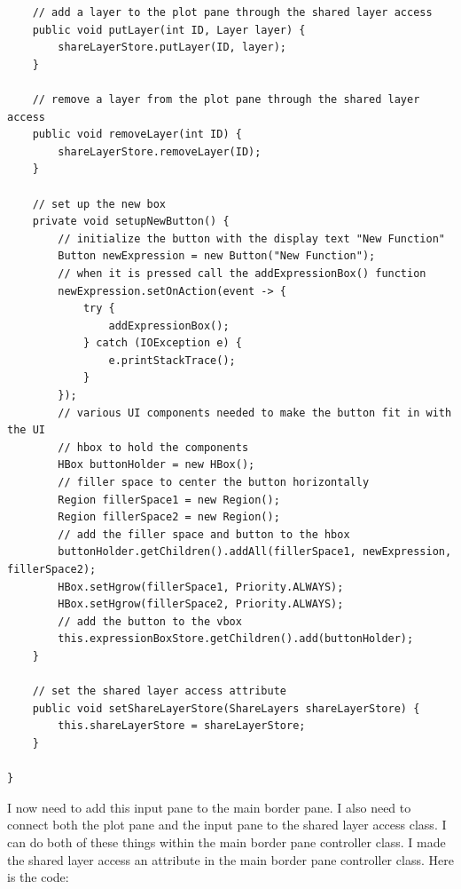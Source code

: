 \documentclass[../../../../main.tex]{subfiles}
\begin{document}
\begin{verbatim}
	// add a layer to the plot pane through the shared layer access
	public void putLayer(int ID, Layer layer) {
		shareLayerStore.putLayer(ID, layer);
	}

	// remove a layer from the plot pane through the shared layer access
	public void removeLayer(int ID) {
		shareLayerStore.removeLayer(ID);
	}

	// set up the new box
	private void setupNewButton() {
		// initialize the button with the display text "New Function"
		Button newExpression = new Button("New Function");
		// when it is pressed call the addExpressionBox() function
		newExpression.setOnAction(event -> {
			try {
				addExpressionBox();
			} catch (IOException e) {
				e.printStackTrace();
			}
		});
		// various UI components needed to make the button fit in with the UI
		// hbox to hold the components
		HBox buttonHolder = new HBox();
		// filler space to center the button horizontally
		Region fillerSpace1 = new Region();
		Region fillerSpace2 = new Region();
		// add the filler space and button to the hbox
		buttonHolder.getChildren().addAll(fillerSpace1, newExpression, fillerSpace2);
		HBox.setHgrow(fillerSpace1, Priority.ALWAYS);
		HBox.setHgrow(fillerSpace2, Priority.ALWAYS);
		// add the button to the vbox
		this.expressionBoxStore.getChildren().add(buttonHolder);
	}

	// set the shared layer access attribute
	public void setShareLayerStore(ShareLayers shareLayerStore) {
		this.shareLayerStore = shareLayerStore;
	}

}
\end{verbatim}
\newpage
I now need to add this input pane to the main border pane. I also need to connect both the plot pane and the input pane to the shared layer access class. I can do both of these things within the main border pane controller class. I made the shared layer access an attribute in the main border pane controller class. Here is the code:
\end{document}
